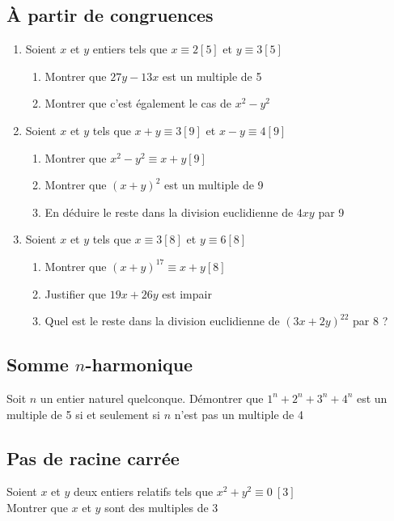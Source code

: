 \documentclass[oneside,12pt]{article}          %
\begin{document}
\subsection{À partir de congruences}

\begin{enumerate}
    \item Soient $x$ et $y$ entiers tels que $x\equiv2[5]$ et $y\equiv3[5]$
    \begin{enumerate}
        \item Montrer que $27y-13x$ est un multiple de 5
        \item Montrer que c'est également le cas de $x^2-y^2$
    \end{enumerate}
    \item Soient $x$ et $y$ tels que $x+y\equiv3[9]$ et $x-y\equiv4[9]$
    \begin{enumerate}
        \item Montrer que $x^2-y^2\equiv x+y[9]$
        \item Montrer que $(x+y)^2$ est un multiple de 9
        \item En déduire le reste dans la division euclidienne de $4xy$ par 9
    \end{enumerate}
    
    \item Soient $x$ et $y$ tels que $x\equiv3[8]$ et $y\equiv6[8]$
    \begin{enumerate}
        \item Montrer que $(x+y)^{17}\equiv x+y [8]$
        \item Justifier que $19x+26y$ est impair
        \item Quel est le reste dans la division euclidienne de $(3x+2y)^{22}$ par 8 ?
    \end{enumerate}
\end{enumerate}



\subsection{Somme $n$-harmonique}
Soit $n$ un entier naturel quelconque.
Démontrer que $1^n + 2^n + 3^n + 4^n$ est un multiple de 5 si et seulement si $n$ n'est pas un multiple de 4



\subsection{Pas de racine carrée}
Soient $x$ et $y$ deux entiers relatifs tels que $x^2 + y^2 \equiv 0 \ [3]$ \\
Montrer que $x$ et $y$ sont des multiples de 3
\end{document}
